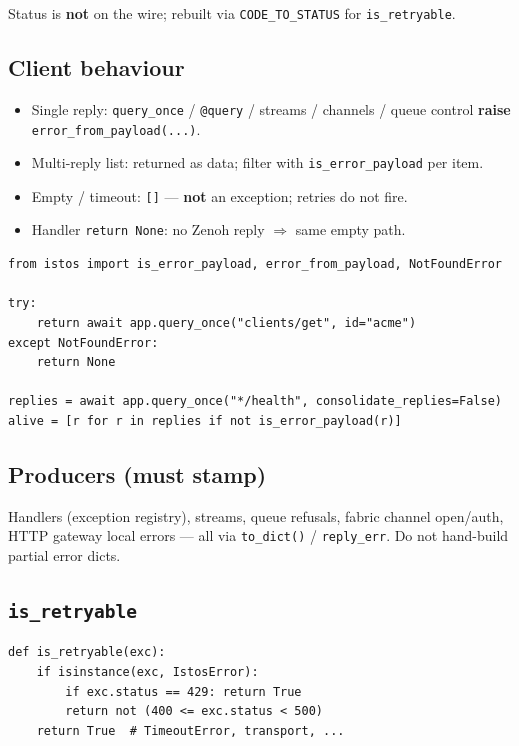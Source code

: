 \documentclass[11pt,a4paper]{article}
\begin{document}
Status is \textbf{not} on the wire; rebuilt via \texttt{CODE\_TO\_STATUS} for
\texttt{is\_retryable}.

\subsection{Client behaviour}

\begin{itemize}[leftmargin=*]
  \item Single reply: \texttt{query\_once} / \texttt{@query} / streams / channels /
        queue control \textbf{raise} \texttt{error\_from\_payload(...)}.
  \item Multi-reply list: returned as data; filter with
        \texttt{is\_error\_payload} per item.
  \item Empty / timeout: \texttt{[]} --- \textbf{not} an exception; retries do not fire.
  \item Handler \texttt{return None}: no Zenoh reply $\Rightarrow$ same empty path.
\end{itemize}

\begin{lstlisting}
from istos import is_error_payload, error_from_payload, NotFoundError

try:
    return await app.query_once("clients/get", id="acme")
except NotFoundError:
    return None

replies = await app.query_once("*/health", consolidate_replies=False)
alive = [r for r in replies if not is_error_payload(r)]
\end{lstlisting}

\subsection{Producers (must stamp)}

Handlers (exception registry), streams, queue refusals, fabric channel
open/auth, HTTP gateway local errors --- all via \texttt{to\_dict()} /
\texttt{reply\_err}. Do not hand-build partial error dicts.

\subsection{\texttt{is\_retryable}}

\begin{lstlisting}
def is_retryable(exc):
    if isinstance(exc, IstosError):
        if exc.status == 429: return True
        return not (400 <= exc.status < 500)
    return True  # TimeoutError, transport, ...
\end{lstlisting}
\end{document}
